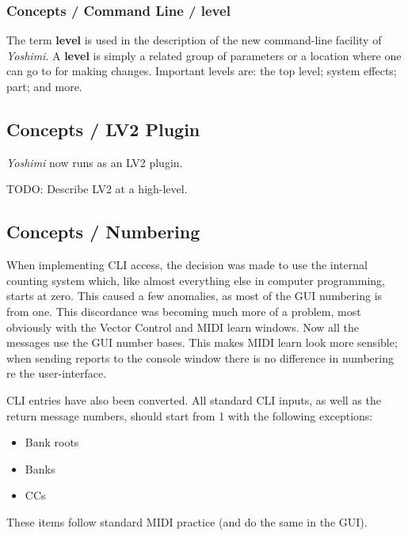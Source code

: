 \subsubsection{Concepts / Command Line / level}
\label{subsubsec:concepts_command_line_level}

   The term \textbf{level} is used in the description of the new command-line
   facility of \textsl{Yoshimi}.
   A \textbf{level} is simply a related group of parameters or a location where
   one can go to for making changes.
   Important levels are:  the top level; system effects; part; and more.

\subsection{Concepts / LV2 Plugin}
\label{subsec:concepts_lv2_plugin}

   \textsl{Yoshimi} now runs as an LV2 plugin.

   TODO: Describe LV2 at a high-level.

\subsection{Concepts / Numbering}
\label{subsec:concepts_numbering}

   When implementing CLI access, the decision was made to use the internal
   counting system which, like almost everything else in computer programming,
   starts at zero. This caused a few anomalies, as most of the GUI numbering is
   from one.  This discordance was becoming much more of a problem, most
   obviously with the Vector Control and MIDI learn windows.
   Now all the messages use the GUI number bases.
   This makes MIDI learn look more sensible; when sending
   reports to the console window there is no difference in numbering re the
   user-interface.

   CLI entries have also been converted. All standard CLI inputs, as well as the
   return message numbers, should start from 1 with the following exceptions:

   \begin{itemize}
      \item Bank roots
      \item Banks
      \item CCs
   \end{itemize}

   These items follow standard MIDI practice (and do the same in the GUI).

